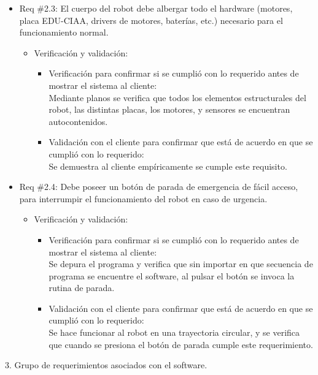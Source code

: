 \documentclass[
11pt, %
codirector, %
]{charter}
\begin{document}
\begin{itemize}
\item Req \#2.3: El cuerpo del robot debe albergar todo el hardware (motores, placa EDU-CIAA, drivers de motores, baterías, etc.) necesario para el funcionamiento normal.
\begin{itemize}
\item Verificación y validación:
	\begin{itemize}
	\item Verificación para confirmar si se cumplió con lo requerido 	antes de mostrar el sistema al cliente:\\
	Mediante planos se verifica que todos los elementos
	estructurales del robot, las distintas placas, los motores, y
	sensores se encuentran autocontenidos.  
	\item Validación con el cliente para confirmar que está de 				acuerdo en que se cumplió con lo requerido:\\
	Se demuestra al cliente empíricamente se cumple este requisito.
	\end{itemize}
\end{itemize}
\end{itemize}

\begin{itemize}
\item Req \#2.4: Debe poseer un botón de parada de emergencia de fácil acceso, para interrumpir el funcionamiento del robot en caso de urgencia.
\begin{itemize}
\item Verificación y validación:
	\begin{itemize}
	\item Verificación para confirmar si se cumplió con lo requerido 	antes de mostrar el sistema al cliente:\\
	Se depura el programa  y verifica que sin importar en que
	secuencia de programa se encuentre el software, al pulsar el
	botón se invoca la rutina de parada.  
	\item Validación con el cliente para confirmar que está de 				acuerdo en que se cumplió con lo requerido:\\
	Se hace funcionar al robot en una  trayectoria circular, y se
	verifica que cuando se presiona el botón de parada cumple este
	requerimiento.  
	\end{itemize}
\end{itemize}
\end{itemize}

3. Grupo de requerimientos asociados con el software.
\end{document}
